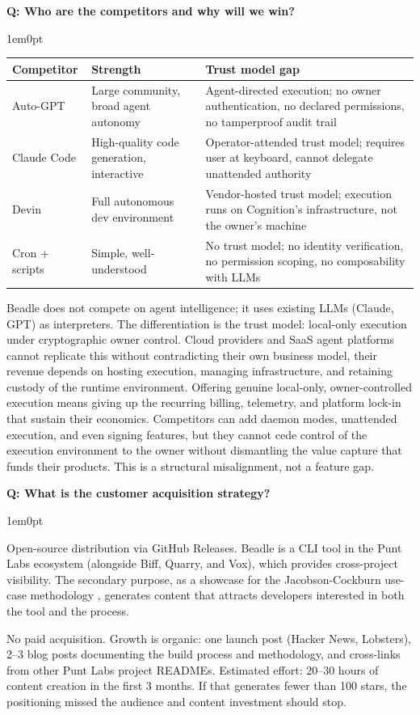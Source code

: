 \documentclass[11pt,letterpaper]{article}
\newcounter{faqnum}
\newenvironment{faqpair}[1]{%
  \needspace{4\baselineskip}%
  \vspace{0.5em}%
  \refstepcounter{faqnum}%
  \noindent\textbf{\color{SectionBlue}Q\thefaqnum: #1}\par\nopagebreak[4]%
  \vspace{0.2em}%
  \begin{adjustwidth}{1em}{0pt}%
  \setlength{\parindent}{0pt}%
}{%
  \end{adjustwidth}%
  \vspace{0.5em}%
}
\begin{document}
\begin{faqpair}{Who are the competitors and why will we win?}\label{faq:competitive-landscape}
  \begin{tabularx}{\linewidth}{@{} l X X @{}}
  \toprule
  \textbf{Competitor} & \textbf{Strength} & \textbf{Trust model gap} \\
  \midrule
  Auto-GPT & Large community, broad agent autonomy &
    Agent-directed execution; no owner authentication, no declared
    permissions, no tamperproof audit trail \\
  Claude Code & High-quality code generation, interactive &
    Operator-attended trust model; requires user at keyboard,
    cannot delegate unattended authority \\
  Devin & Full autonomous dev environment &
    Vendor-hosted trust model; execution runs on Cognition's
    infrastructure, not the owner's machine \\
  Cron + scripts & Simple, well-understood &
    No trust model; no identity verification, no permission
    scoping, no composability with LLMs \\
  \bottomrule
  \end{tabularx}

  \vspace{0.5em}
  Beadle does not compete on agent intelligence; it uses existing LLMs
  (Claude, GPT) as interpreters. The differentiation is the trust model:
  local-only execution under cryptographic owner control. Cloud providers and
  SaaS agent platforms cannot replicate this without contradicting their own
  business model, their revenue depends on hosting execution, managing
  infrastructure, and retaining custody of the runtime environment. Offering
  genuine local-only, owner-controlled execution means giving up the recurring
  billing, telemetry, and platform lock-in that sustain their economics.
  Competitors can add daemon modes, unattended execution, and even signing
  features, but they cannot cede control of the execution environment to the
  owner without dismantling the value capture that funds their products. This
  is a structural misalignment, not a feature gap.
\end{faqpair}

\begin{faqpair}{What is the customer acquisition strategy?}
  Open-source distribution via GitHub Releases. Beadle is a CLI tool in the Punt
  Labs ecosystem (alongside Biff, Quarry, and Vox), which provides cross-project
  visibility. The secondary purpose, as a showcase for the Jacobson-Cockburn
  use-case methodology \cite{jacobson2023usecases}, generates content that
  attracts developers interested in both the tool and the process.

  No paid acquisition. Growth is organic: one launch post (Hacker News,
  Lobsters), 2--3 blog posts documenting the build process and methodology,
  and cross-links from other Punt Labs project READMEs. Estimated effort:
  20--30 hours of content creation in the first 3 months. If that generates
  fewer than 100 stars, the positioning missed the audience and content
  investment should stop.
\end{faqpair}
\end{document}
